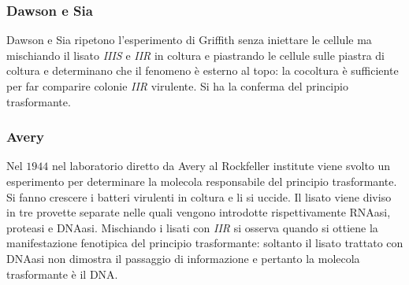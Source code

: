 \subsubsection{Dawson e Sia}
Dawson e Sia ripetono l'esperimento di Griffith senza iniettare le cellule ma mischiando il lisato \emph{IIIS} e \emph{IIR} in coltura e piastrando le cellule sulle piastra di coltura e determinano
che il fenomeno \`e esterno al topo: la cocoltura \`e sufficiente per far comparire colonie \emph{IIR} virulente. Si ha la conferma del principio trasformante. 
\subsubsection{Avery}
Nel $1944$ nel laboratorio diretto da Avery al Rockfeller institute viene svolto un esperimento per determinare la molecola responsabile del principio trasformante. Si fanno crescere
i batteri virulenti in coltura e li si uccide. Il lisato viene diviso in tre provette separate nelle quali vengono introdotte rispettivamente RNAasi, proteasi e DNAasi. Mischiando 
i lisati con \emph{IIR} si osserva quando si ottiene la manifestazione fenotipica del principio trasformante: soltanto il lisato trattato con DNAasi non dimostra il passaggio di informazione
e pertanto la molecola trasformante \`e il DNA. 
